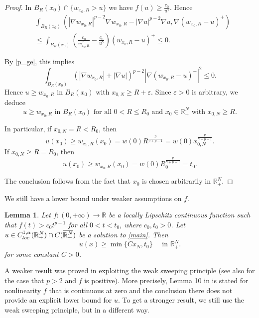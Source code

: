 \documentclass[reqno]{amsart}
\theoremstyle{plain}
\newtheorem{lemma}[theorem]{Lemma}
\theoremstyle{definition}
\theoremstyle{remark}
\begin{document}
\begin{proof}
		In $B_R(x_0)\cap\{w_{x_0,R} > u\}$ we have $f(u) \ge \frac{c_0}{u^\gamma}$. Hence
		\begin{align*}
			&\int_{B_R(x_0)} (|\nabla w_{x_0,R}|^{p-2}\nabla w_{x_0,R} - |\nabla u|^{p-2}\nabla u, \nabla (w_{x_0,R}-u)^+) \\
			&\le \int_{B_R(x_0)} \left(\frac{c_0}{w_{x_0,R}^\gamma} - \frac{c_0}{u^\gamma}\right) (w_{x_0,R}-u)^+ \le 0.
		\end{align*}
		
		By \eqref{p_ge}, this implies
		\[
		\int_{B_R(x_0)} (|\nabla w_{x_0,R}| + |\nabla u|)^{p-2} |\nabla (w_{x_0,R}-u)^+|^2 \le 0.
		\]
		Hence $u \ge w_{x_0,R}$ in $B_R(x_0)$ with $x_{0,N} \ge R + \varepsilon$. Since $\varepsilon>0$ is arbitrary, we deduce
		\[
		u \ge w_{x_0,R} \text{ in } B_R(x_0) \text{ for all } 0<R\le R_0 \text{ and } x_0 \in \mathbb{R}^N_+ \text{ with } x_{0,N} \ge R.
		\]
		
		In particular, if $x_{0,N} = R < R_0$, then
		\[
		u(x_0) \ge w_{x_0,R}(x_0) = w(0)R^\frac{p}{\gamma+p-1} = w(0) x_{0,N}^\frac{p}{\gamma+p-1}.
		\]
		If $x_{0,N} \ge R = R_0$, then
		\[
		u(x_0) \ge w_{x_0,R}(x_0) = w(0)R_0^\frac{p}{\gamma+p-1} = t_0.
		\]
		
		The conclusion follows from the fact that $x_0$ is chosen arbitrarily in $\mathbb{R}^N_+$.
	\end{proof}
	We still have a lower bound under weaker assumptions on $f$.
	\begin{lemma}\label{lem:positive}
		Let $f:(0,+\infty)\to\mathbb{R}$ be a locally Lipschitz continuous function such that $f(t) > c_0t^{p-1}$ for all $0<t<t_0$, where $c_0,t_0>0$. Let $u \in C^{1,\alpha}_{\rm loc}(\mathbb{R}^N_+) \cap C(\overline{\mathbb{R}^N_+})$ be a solution to \eqref{main}.
		Then
		\[
		u(x) \ge \min\{C x_N, t_0\} \quad\text{ in } \mathbb{R}^N_+.
		\]
		for some constant $C>0$.
	\end{lemma}	
	A weaker result was proved in \cite{10.1007/s11118-024-10157-1} exploiting the weak sweeping principle (see also \cite[Lemma 3]{MR3118616} for the case that $p>2$ and $f$ is positive).
	More precisely, Lemma 10 in \cite{10.1007/s11118-024-10157-1} is stated for nonlinearity $f$ that is continuous at zero and the conclusion there does not provide an explicit lower bound for $u$. To get a stronger result, we still use the weak sweeping principle, but in a different way.
\end{document}
